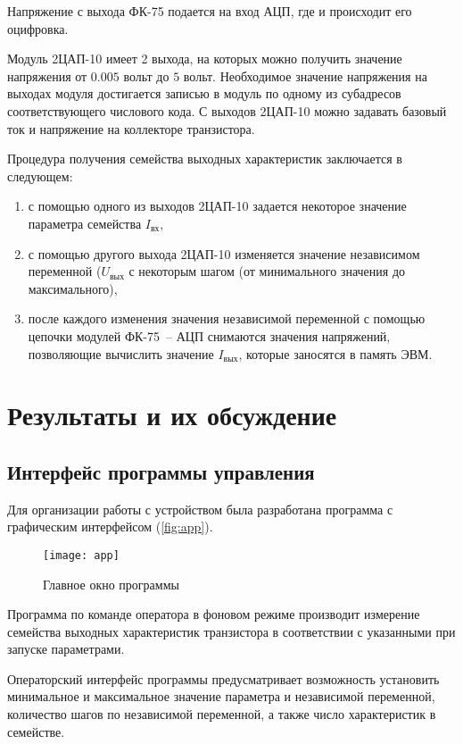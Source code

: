 Напряжение с выхода ФК-75 подается на вход АЦП, где и происходит его оцифровка.

Модуль 2ЦАП-10 имеет 2 выхода, на которых можно получить значение напряжения от $0.005$ вольт до $5$ вольт. Необходимое значение напряжения на выходах модуля достигается записью в модуль по одному из субадресов соответствующего числового кода. С выходов 2ЦАП-10 можно задавать базовый ток и напряжение на коллекторе транзистора.

Процедура получения семейства выходных характеристик заключается в следующем:
%
\begin{enumerate}
    \item с помощью одного из выходов 2ЦАП-10 задается некоторое значение параметра семейства $I_\text{вх}$,
    \item с помощью другого выхода 2ЦАП-10 изменяется значение независимом переменной ($U_\text{вых}$ с некоторым шагом (от минимального значения до максимального),
    \item после каждого изменения значения независимой переменной с помощью цепочки модулей ФК-75~-- АЦП снимаются значения напряжений, позволяющие вычислить значение $I_\text{вых}$, которые заносятся в память ЭВМ.
\end{enumerate}

\section{Результаты и их обсуждение}

\subsection{Интерфейс программы управления}

Для организации работы с устройством была разработана программа с графическим интерфейсом (\autoref{fig:app}).

\begin{figure}[h]%
\centering
\texttt{[image: app]}%
\caption[]{Главное окно программы}%
\label{fig:app}%
\end{figure}

Программа по команде оператора в фоновом режиме производит измерение семейства выходных характеристик транзистора в соответствии с указанными при запуске параметрами.

Операторский интерфейс программы предусматривает возможность установить минимальное и максимальное значение параметра и независимой переменной, количество шагов по независимой переменной, а также число характеристик в семействе.

